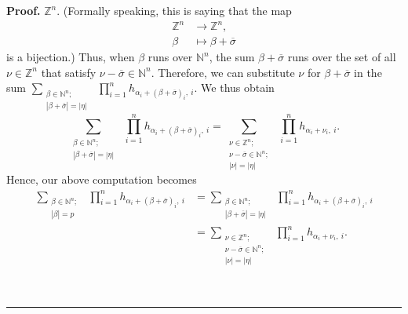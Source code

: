 \documentclass[numbers=enddot,12pt,final,onecolumn,notitlepage,english]{scrartcl}%
\theoremstyle{definition}
\newenvironment{proof}[1][Proof]{\noindent\textbf{#1.} }{\ \rule{0.5em}{0.5em}}
\let\sumnonlimits\sum
\let\prodnonlimits\prod
\renewcommand{\sum}{\sumnonlimits\limits}
\renewcommand{\prod}{\prodnonlimits\limits}
\newenvironment{vershort}{}{}
\begin{document}
\begin{vershort}
\begin{proof}
$\mathbb{Z}^{n}$. (Formally speaking, this is saying that the map
\begin{align*}
\mathbb{Z}^{n}  &  \rightarrow\mathbb{Z}^{n},\\
\beta &  \mapsto\beta+\overline{\sigma}%
\end{align*}
is a bijection.) Thus, when $\beta$ runs over $\mathbb{N}^{n}$, the sum
$\beta+\overline{\sigma}$ runs over the set of all $\nu\in\mathbb{Z}^{n}$ that
satisfy $\nu-\overline{\sigma}\in\mathbb{N}^{n}$. Therefore, we can substitute
$\nu$ for $\beta+\overline{\sigma}$ in the sum $\sum_{\substack{\beta
\in\mathbb{N}^{n};\\\left\vert \beta+\overline{\sigma}\right\vert =\left\vert
\eta\right\vert }}\ \ \prod_{i=1}^{n}h_{\alpha_{i}+\left(  \beta
+\overline{\sigma}\right)  _{i},\ i}$. We thus obtain%
\[
\sum_{\substack{\beta\in\mathbb{N}^{n};\\\left\vert \beta+\overline{\sigma
}\right\vert =\left\vert \eta\right\vert }}\ \ \prod_{i=1}^{n}h_{\alpha
_{i}+\left(  \beta+\overline{\sigma}\right)  _{i},\ i}=\sum_{\substack{\nu
\in\mathbb{Z}^{n};\\\nu-\overline{\sigma}\in\mathbb{N}^{n};\\\left\vert
\nu\right\vert =\left\vert \eta\right\vert }}\ \ \prod_{i=1}^{n}h_{\alpha
_{i}+\nu_{i},\ i}.
\]
Hence, our above computation becomes%
\begin{align}
\sum_{\substack{\beta\in\mathbb{N}^{n};\\\left\vert \beta\right\vert
=p}}\ \ \prod_{i=1}^{n}h_{\alpha_{i}+\left(  \beta+\overline{\sigma}\right)
_{i},\ i}  &  =\sum_{\substack{\beta\in\mathbb{N}^{n};\\\left\vert
\beta+\overline{\sigma}\right\vert =\left\vert \eta\right\vert }%
}\ \ \prod_{i=1}^{n}h_{\alpha_{i}+\left(  \beta+\overline{\sigma}\right)
_{i},\ i}\nonumber\\
&  =\sum_{\substack{\nu\in\mathbb{Z}^{n};\\\nu-\overline{\sigma}\in
\mathbb{N}^{n};\\\left\vert \nu\right\vert =\left\vert \eta\right\vert
}}\ \ \prod_{i=1}^{n}h_{\alpha_{i}+\nu_{i},\ i}.
\label{pf.thm.pre-pieri.short.innersum}%
\end{align}



\end{proof}
\end{vershort}
\end{document}
